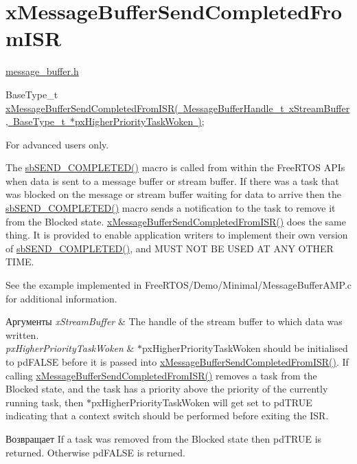 \hypertarget{group__x_message_buffer_send_completed_from_i_s_r}{}\section{x\+Message\+Buffer\+Send\+Completed\+From\+I\+SR}
\label{group__x_message_buffer_send_completed_from_i_s_r}
\mbox{\hyperlink{message__buffer_8h}{message\+\_\+buffer.\+h}}


\begin{DoxyPre}
BaseType\_t \mbox{\hyperlink{message__buffer_8h_a45918d12bf530cb2b4bf21c0936460a9}{xMessageBufferSendCompletedFromISR( MessageBufferHandle\_t xStreamBuffer, BaseType\_t *pxHigherPriorityTaskWoken )}};
\end{DoxyPre}


For advanced users only.

The \mbox{\hyperlink{stream__buffer_8c_aa75273dfbcd92710254df0165ae1da5d}{sb\+S\+E\+N\+D\+\_\+\+C\+O\+M\+P\+L\+E\+T\+E\+D()}} macro is called from within the Free\+R\+T\+OS A\+P\+Is when data is sent to a message buffer or stream buffer. If there was a task that was blocked on the message or stream buffer waiting for data to arrive then the \mbox{\hyperlink{stream__buffer_8c_aa75273dfbcd92710254df0165ae1da5d}{sb\+S\+E\+N\+D\+\_\+\+C\+O\+M\+P\+L\+E\+T\+E\+D()}} macro sends a notification to the task to remove it from the Blocked state. \mbox{\hyperlink{message__buffer_8h_a45918d12bf530cb2b4bf21c0936460a9}{x\+Message\+Buffer\+Send\+Completed\+From\+I\+S\+R()}} does the same thing. It is provided to enable application writers to implement their own version of \mbox{\hyperlink{stream__buffer_8c_aa75273dfbcd92710254df0165ae1da5d}{sb\+S\+E\+N\+D\+\_\+\+C\+O\+M\+P\+L\+E\+T\+E\+D()}}, and M\+U\+ST N\+OT BE U\+S\+ED AT A\+NY O\+T\+H\+ER T\+I\+ME.

See the example implemented in Free\+R\+T\+O\+S/\+Demo/\+Minimal/\+Message\+Buffer\+A\+M\+P.\+c for additional information.


\begin{DoxyParams}{Аргументы}
{\em x\+Stream\+Buffer} & The handle of the stream buffer to which data was written.\\
\hline
{\em px\+Higher\+Priority\+Task\+Woken} & $\ast$px\+Higher\+Priority\+Task\+Woken should be initialised to pd\+F\+A\+L\+SE before it is passed into \mbox{\hyperlink{message__buffer_8h_a45918d12bf530cb2b4bf21c0936460a9}{x\+Message\+Buffer\+Send\+Completed\+From\+I\+S\+R()}}. If calling \mbox{\hyperlink{message__buffer_8h_a45918d12bf530cb2b4bf21c0936460a9}{x\+Message\+Buffer\+Send\+Completed\+From\+I\+S\+R()}} removes a task from the Blocked state, and the task has a priority above the priority of the currently running task, then $\ast$px\+Higher\+Priority\+Task\+Woken will get set to pd\+T\+R\+UE indicating that a context switch should be performed before exiting the I\+SR.\\
\hline
\end{DoxyParams}
\begin{DoxyReturn}{Возвращает}
If a task was removed from the Blocked state then pd\+T\+R\+UE is returned. Otherwise pd\+F\+A\+L\+SE is returned. 
\end{DoxyReturn}
